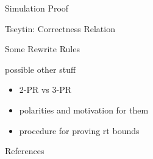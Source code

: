 \documentclass[11pt,usenames,dvipsnames,
hyperref={pdfencoding=auto,psdextra}]{beamer}
\begin{document}
\begin{frame}{Simulation Proof}
\end{frame}

\begin{frame}{Tseytin: Correctness Relation}
\end{frame}

\begin{frame}{Some Rewrite Rules}
\end{frame}

\begin{frame}{possible other stuff}
  \begin{itemize}
    \item 2-PR vs 3-PR
    \item polarities and motivation for them
    \item procedure for proving rt bounds
  \end{itemize}
\end{frame}

\begin{frame}[allowframebreaks]{References}
  \nocite{Sipser:TheoryofComputation}
  \nocite{Bläser:TISkript}
  
  {}
\end{frame}
\end{document}

